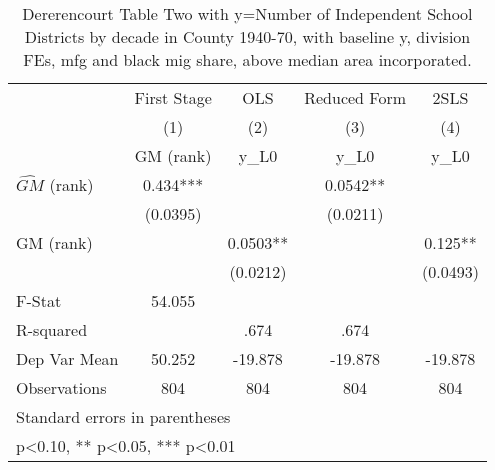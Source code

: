\begin{table}[htbp]\centering
\def\sym#1{\ifmmode^{#1}\else\(^{#1}\)\fi}
\caption{Dererencourt Table Two with y=Number of Independent School Districts by decade in County 1940-70, with baseline y, division FEs, mfg and black mig share, above median area incorporated.}
\begin{tabular}{l*{4}{c}}
\toprule
                    & First Stage   &         OLS   &Reduced Form   &        2SLS   \\
                    &\multicolumn{1}{c}{(1)}&\multicolumn{1}{c}{(2)}&\multicolumn{1}{c}{(3)}&\multicolumn{1}{c}{(4)}\\
                    &\multicolumn{1}{c}{GM  (rank)}&\multicolumn{1}{c}{y\_L0}&\multicolumn{1}{c}{y\_L0}&\multicolumn{1}{c}{y\_L0}\\
\midrule
$\hat{GM}$ (rank)   &       0.434***&               &      0.0542** &               \\
                    &    (0.0395)   &               &    (0.0211)   &               \\
\addlinespace
GM  (rank)          &               &      0.0503** &               &       0.125** \\
                    &               &    (0.0212)   &               &    (0.0493)   \\
\midrule
F-Stat              &      54.055   &               &               &               \\
R-squared           &               &        .674   &        .674   &               \\
Dep Var Mean        &      50.252   &     -19.878   &     -19.878   &     -19.878   \\
Observations        &         804   &         804   &         804   &         804   \\
\bottomrule
\multicolumn{5}{l}{\footnotesize Standard errors in parentheses}\\
\multicolumn{5}{l}{\footnotesize * p<0.10, ** p<0.05, *** p<0.01}\\
\end{tabular}
\end{table}
